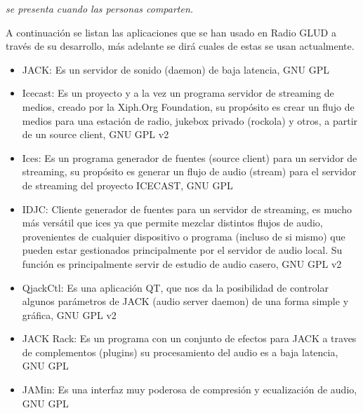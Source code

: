 \begin{multicols}{2}

\begin{entradilla} %
{\em {\color{introcolor}{Poder Social}} se presenta cuando las personas comparten.}
\end{entradilla}

A continuación se listan las aplicaciones que se han usado en Radio GLUD a través de su desarrollo, más adelante se dirá cuales de estas se usan actualmente.

\begin{itemize}
\item JACK: Es un servidor de sonido (daemon) de baja latencia, GNU GPL
\end{itemize}
\begin{itemize}
\item Icecast: Es un proyecto y a la vez un programa servidor de streaming de medios, creado por la Xiph.Org Foundation, su propósito es crear un flujo de medios para una estación de radio, jukebox privado (rockola) y otros, a partir de un source client, GNU GPL v2
\item Ices: Es un programa generador de fuentes (source client) para un servidor de streaming, su propósito es generar un flujo de audio (stream) para el servidor de streaming del proyecto ICECAST, GNU GPL
\item IDJC: Cliente generador de fuentes para un servidor de streaming, es mucho más versátil que ices ya que permite mezclar distintos flujos de audio, provenientes de cualquier dispositivo o programa (incluso de si mismo) que pueden estar gestionados principalmente por el servidor de audio local. Su función es principalmente servir de estudio de audio casero, GNU GPL v2
\item QjackCtl: Es una aplicación QT, que nos da la posibilidad de controlar algunos parámetros de JACK (audio server daemon) de una forma simple y gráfica, GNU GPL v2
\item JACK Rack: Es un programa con un conjunto de efectos para JACK a traves de complementos (plugins) su procesamiento del audio es a baja latencia, GNU GPL
\item JAMin: Es una interfaz muy poderosa de compresión y ecualización de audio, GNU GPL

\end{itemize}
\end{multicols}
